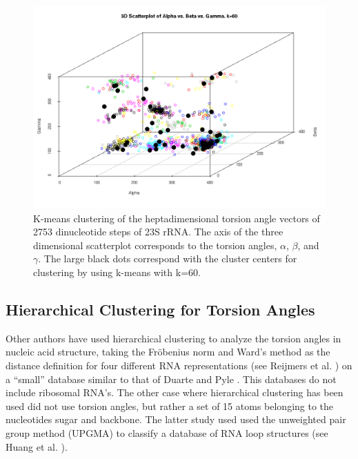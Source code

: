 \begin{figure}[htbp]
 \centering
 \includegraphics[angle=90, scale=0.50]{Chapter2/hartigan_k60_3D_b.png}
 \caption{K-means  clustering  of  the heptadimensional  torsion  angle
vectors of 2753 dinucleotide steps of  23S rRNA. The axis of the three
dimensional scatterplot  corresponds to the  torsion angles, $\alpha$,
$\beta$,  and $\gamma$.   The  large black  dots  correspond with  the
cluster centers for clustering by using k-means with k=60.}
 \label{fig:3d}
\end{figure}


\subsection{Hierarchical Clustering for Torsion Angles}
Other  authors have  used hierarchical clustering  to analyze the
torsion angles in nucleic acid structure, taking the Fr\"{o}benius
norm and Ward's method as the distance definition
for   four   different    RNA   representations   (see   Reijmers   et
al.  \cite{reijmers2001}) on  a ``small''  database similar to that of
Duarte and Pyle  \cite{duarte1998}. This  databases  do not
include ribosomal RNA's. The other  case where hierarchical clustering
has been used  did not  use torsion  angles, but rather a set  of  15 atoms
belonging  to the  nucleotides sugar  and  backbone. The latter study
used used  the unweighted pair  group method  (UPGMA) to classify  a database  of RNA
loop structures (see Huang et al. \cite{huang2005}).

